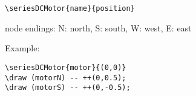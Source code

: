 \documentclass[parskip=full]{scrartcl}
\begin{document}
\begin{verbatim}
\seriesDCMotor{name}{position}
\end{verbatim}
node endings: N: north, S: south, W: west, E: east

Example:\\
\begin{minipage}{0.8\textwidth}
\begin{verbatim}
\seriesDCMotor{motor}{(0,0)}
\draw (motorN) -- ++(0,0.5);
\draw (motorS) -- ++(0,-0.5);
\end{verbatim}
\end{minipage}
\begin{minipage}{0.19\textwidth}
\end{minipage}
\end{document}
